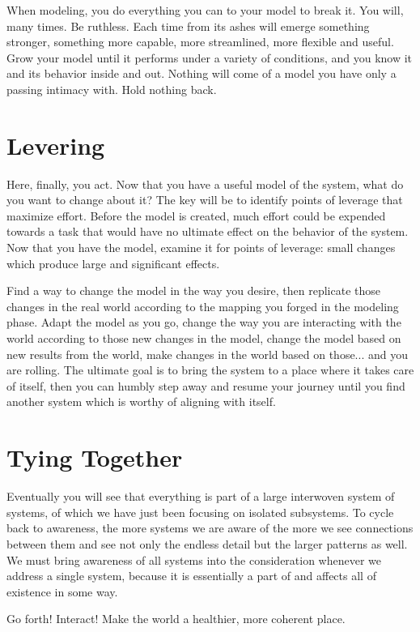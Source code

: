 \documentclass[11pt]{article}
\begin{document}
When modeling, you do everything you can to your model to break it.  You will, many times.  Be ruthless.  Each time from its ashes will emerge something stronger, something more capable, more streamlined, more flexible and useful.  Grow your model until it performs under a variety of conditions, and you know it and its behavior inside and out.  Nothing will come of a model you have only a passing intimacy with.  Hold nothing back.

\section{Levering}

Here, finally, you act.  Now that you have a useful model of the system, what do you want to change about it?  The key will be to identify points of leverage that maximize effort.  Before the model is created, much effort could be expended towards a task that would have no ultimate effect on the behavior of the system.  Now that you have the model, examine it for points of leverage: small changes which produce large and significant effects.

Find a way to change the model in the way you desire, then replicate those changes in the real world according to the mapping you forged in the modeling phase.  Adapt the model as you go, change the way you are interacting with the world according to those new changes in the model, change the model based on new results from the world, make changes in the world based on those... and you are rolling.  The ultimate goal is to bring the system to a place where it takes care of itself, then you can humbly step away and resume your journey until you find another system which is worthy of aligning with itself.  

\section{Tying Together}

Eventually you will see that everything is part of a large interwoven system of systems, of which we have just been focusing on isolated subsystems.  To cycle back to awareness, the more systems we are aware of the more we see connections between them and see not only the endless detail but the larger patterns as well.  We must bring awareness of all systems into the consideration whenever we address a single system, because it is essentially a part of and affects all of existence in some way.  

Go forth!  Interact!  Make the world a healthier, more coherent place.
\end{document}
